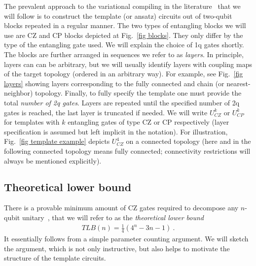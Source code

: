 \documentclass[twocolumn, amsfonts, amssymb, aps, nofootinbib]{revtex4-2}
\newcommand{\CZ}{\textsf{CZ }}
\newcommand{\CP}{\textsf{CP }}
\begin{document}
The prevalent approach to the variational compiling in the literature~\cite{Khatri2019, Madden2021, Rakyta2021, Nakanishi2021, Rakyta2022} that we will follow is to construct the template (or ansatz) circuits out of two-qubit blocks repeated in a regular manner. The two types of entangling blocks we will use are \CZ and \CP blocks depicted at Fig.~\ref{fig blocks}. They only differ by the type of the entangling gate used. We will explain the choice of 1q gates shortly. The blocks are further arranged in sequences we refer to as \textit{layers}. In principle, layers can can be arbitrary, but we will usually identify layers with coupling maps of the target topology (ordered in an arbitrary way). For example, see Fig.~\ref{fig layers} showing layers corresponding to the fully connected and chain (or nearest-neighbor) topology. Finally, to fully specify the template one must provide the total \textit{number of 2q gates}. Layers are repeated until the specified number of 2q gates is reached, the last layer is truncated if needed. We will write $U^k_{CZ}$ or $U^k_{CP}$ for templates with $k$ entangling gates of type \CZ or \CP respectively (layer specification is assumed but left implicit in the notation). For illustration, Fig.~\ref{fig template example} depicts $U^4_{CZ}$ on a connected topology (here and in the following connected topology means fully connected; connectivity restrictions will always be mentioned explicitly).


\subsection{Theoretical lower bound \label{sec tlb}}
There is a provable minimum amount of \CZ gates required to decompose any $n$-qubit unitary~\cite{Shende2004}, that we will refer to as the \textit{theoretical lower bound}
\begin{align}
TLB(n) = \frac14\left(4^n-3n-1\right) \ . \label{TLB}
\end{align}
It essentially follows from a simple parameter counting argument. We will sketch the argument, which is not only instructive, but also helps to motivate the structure of the template circuits.
\end{document}
